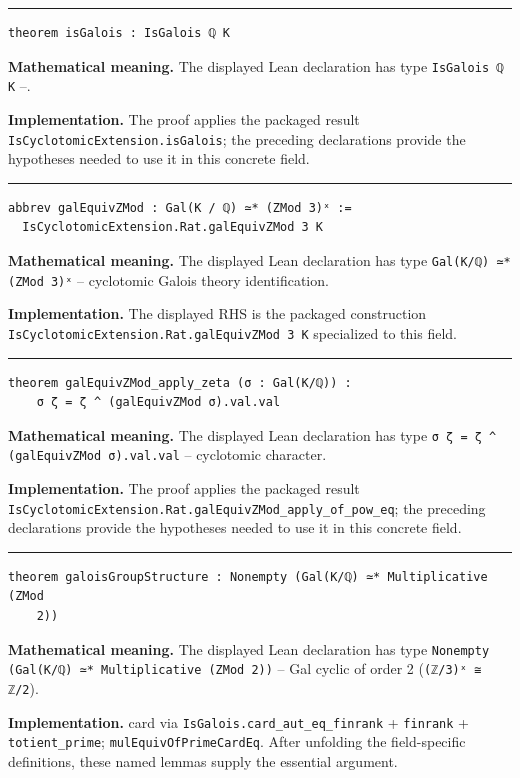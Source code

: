 \documentclass[UTF8,a4paper,11pt,fontset=fandol]{ctexart}
\theoremstyle{definition}
\newcommand{\statementsep}{\par\medskip\hrule\medskip}
\begin{document}
\statementsep
\begin{verbatim}
theorem isGalois : IsGalois ℚ K
\end{verbatim}
\noindent\textbf{Mathematical meaning.} The displayed Lean declaration has type \texttt{IsGalois ℚ K} --.\par
\noindent\textbf{Implementation.} The proof applies the packaged result \texttt{IsCyclotomicExtension.\allowbreak{}isGalois}; the preceding declarations provide the hypotheses needed to use it in this concrete field.\par
\statementsep
\begin{verbatim}
abbrev galEquivZMod : Gal(K / ℚ) ≃* (ZMod 3)ˣ :=
  IsCyclotomicExtension.Rat.galEquivZMod 3 K
\end{verbatim}
\noindent\textbf{Mathematical meaning.} The displayed Lean declaration has type \texttt{Gal(K/\allowbreak{}ℚ) ≃* (ZMod 3)ˣ} -- cyclotomic Galois theory identification.\par
\noindent\textbf{Implementation.} The displayed RHS is the packaged construction \texttt{IsCyclotomicExtension.\allowbreak{}Rat.\allowbreak{}galEquivZMod 3 K} specialized to this field.\par
\statementsep
\begin{verbatim}
theorem galEquivZMod_apply_zeta (σ : Gal(K/ℚ)) :
    σ ζ = ζ ^ (galEquivZMod σ).val.val
\end{verbatim}
\noindent\textbf{Mathematical meaning.} The displayed Lean declaration has type \texttt{σ ζ = ζ \textasciicircum{} (galEquivZMod σ).\allowbreak{}val.\allowbreak{}val} -- cyclotomic character.\par
\noindent\textbf{Implementation.} The proof applies the packaged result \texttt{IsCyclotomicExtension.\allowbreak{}Rat.\allowbreak{}galEquivZMod\_\allowbreak{}apply\_\allowbreak{}of\_\allowbreak{}pow\_\allowbreak{}eq}; the preceding declarations provide the hypotheses needed to use it in this concrete field.\par
\statementsep
\begin{verbatim}
theorem galoisGroupStructure : Nonempty (Gal(K/ℚ) ≃* Multiplicative (ZMod
    2))
\end{verbatim}
\noindent\textbf{Mathematical meaning.} The displayed Lean declaration has type \texttt{Nonempty (Gal(K/\allowbreak{}ℚ) ≃* Multiplicative (ZMod 2))} -- Gal cyclic of order 2 (\texttt{(ℤ/\allowbreak{}3)ˣ ≅ ℤ/\allowbreak{}2}).\par
\noindent\textbf{Implementation.} card via \texttt{IsGalois.\allowbreak{}card\_\allowbreak{}aut\_\allowbreak{}eq\_\allowbreak{}finrank} + \texttt{finrank} + \texttt{totient\_\allowbreak{}prime}; \texttt{mulEquivOfPrimeCardEq}. After unfolding the field-specific definitions, these named lemmas supply the essential argument.\par
\end{document}
